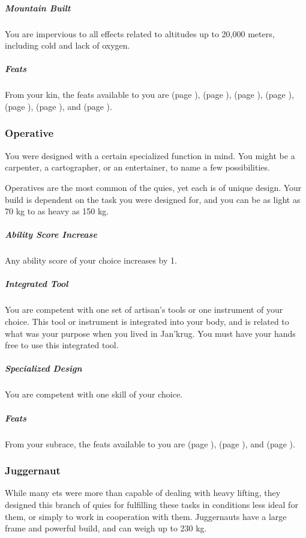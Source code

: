     \subparagraph{Mountain Built} You are impervious to all effects related to altitudes up to 20,000 meters, including cold and lack of oxygen.

    \subparagraph{Feats} From your kin, the feats available to you are
    \textbf{} (page \pageref{feat::}),
    \textbf{} (page \pageref{feat::}),
    \textbf{} (page \pageref{feat::}),
    \textbf{} (page \pageref{feat::}),
    \textbf{} (page \pageref{feat::}),
    \textbf{} (page \pageref{feat::}), and
    \textbf{} (page \pageref{feat::}).

\subsubsection{Operative}
    You were designed with a certain specialized function in mind.
    You might be a carpenter, a cartographer, or an entertainer, to name a few possibilities.

    Operatives are the most common of the quies, yet each is of unique design.
    Your build is dependent on the task you were designed for, and you can be as light as 70 kg to as heavy as 150 kg.

    \subparagraph{Ability Score Increase} Any ability score of your choice increases by 1.

    \subparagraph{Integrated Tool} You are competent with one set of artisan's tools or one instrument of your choice.
    This tool or instrument is integrated into your body, and is related to what was your purpose when you lived in Jan'krug.
    You must have your hands free to use this integrated tool.

    \subparagraph{Specialized Design} You are competent with one skill of your choice.

    \subparagraph{Feats} From your subrace, the feats available to you are
    \textbf{} (page \pageref{feat::}),
    \textbf{} (page \pageref{feat::}), and
    \textbf{} (page \pageref{feat::}).

\subsubsection{Juggernaut}
    While many ets were more than capable of dealing with heavy lifting, they designed this branch of quies for fulfilling these tasks in conditions less ideal for them, or simply to work in cooperation with them.
    Juggernauts have a large frame and powerful build, and can weigh up to 230 kg.

